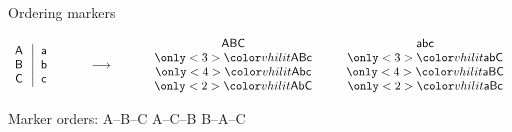 \documentclass[12pt,t]{beamer}
\begin{document}
\begin{frame}{Ordering markers}

\vspace{5mm}

$$
\begin{array}{c} \mathsf{A} \\ \mathsf{B} \\ \mathsf{C} \end{array}
\left|
\begin{array}{c} \mathsf{a} \\ \mathsf{b} \\ \mathsf{c} \end{array}
\right.
\hspace*{1cm} \longrightarrow \hspace*{1cm}
\begin{array}{ccc} \mathsf{ABC} & \hspace*{3mm} & \mathsf{abc} \\
\only<3>{\vhilit} \mathsf{ABc} & \hspace*{3mm} & \only<3>{\vhilit} \mathsf{abC} \\
\only<4>{\vhilit} \mathsf{Abc} & \hspace*{3mm} & \only<4>{\vhilit} \mathsf{aBC} \\
\only<2>{\vhilit} \mathsf{AbC} & \hspace*{3mm} & \only<2>{\vhilit}\mathsf{aBc} \end{array}
$$

\vspace{5mm}
\begin{center}

{\hilit Marker orders: \hspace{5mm}
{ \only<2>{ \vhilit } A--B--C } \hspace{5mm} { 
  A--C--B } \hspace{5mm} {  B--A--C }}

\vspace{15mm}


\end{center}

\end{frame}
\end{document}
